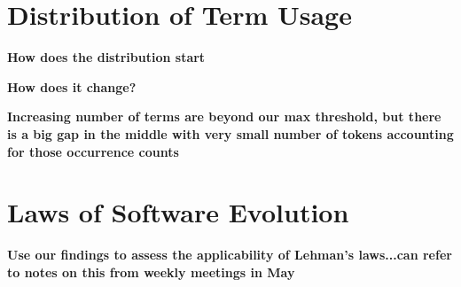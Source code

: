 % 
% 

\section{Distribution of Term Usage} %
\label{sec:distribution_of_term_usage}

\textbf{How does the distribution start}

\textbf{How does it change?}

\textbf{Increasing number of terms are beyond our max threshold, but there is a big gap in the middle with very small number of tokens accounting for those occurrence counts}


% 
% 

% 
% 

\section{Laws of Software Evolution} %
\label{sec:laws_of_software_evolution}

\textbf{Use our findings to assess the applicability of Lehman's laws...can refer to notes on this from weekly meetings in May}

